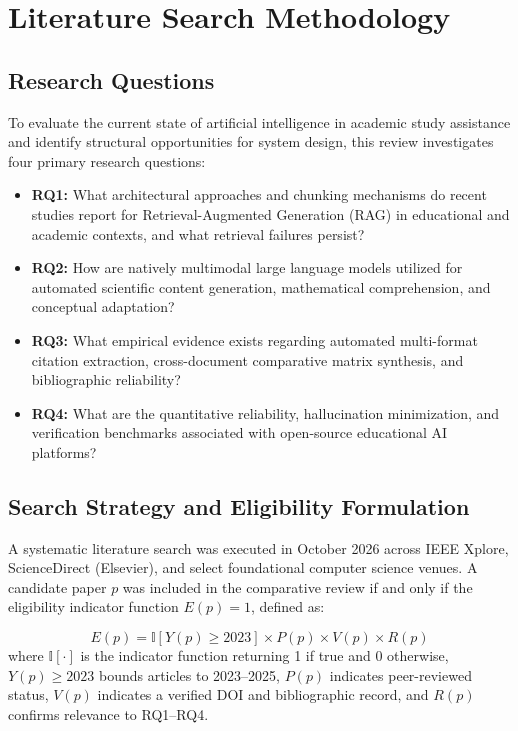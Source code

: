 \documentclass[conference]{IEEEtran}
\begin{document}
\section{Literature Search Methodology}

\subsection{Research Questions}
To evaluate the current state of artificial intelligence in academic study assistance and identify structural opportunities for system design, this review investigates four primary research questions:
\begin{itemize}
    \item \textbf{RQ1:} What architectural approaches and chunking mechanisms do recent studies report for Retrieval-Augmented Generation (RAG) in educational and academic contexts, and what retrieval failures persist?
    \item \textbf{RQ2:} How are natively multimodal large language models utilized for automated scientific content generation, mathematical comprehension, and conceptual adaptation?
    \item \textbf{RQ3:} What empirical evidence exists regarding automated multi-format citation extraction, cross-document comparative matrix synthesis, and bibliographic reliability?
    \item \textbf{RQ4:} What are the quantitative reliability, hallucination minimization, and verification benchmarks associated with open-source educational AI platforms?
\end{itemize}

\subsection{Search Strategy and Eligibility Formulation}
A systematic literature search was executed in October 2026 across IEEE Xplore, ScienceDirect (Elsevier), and select foundational computer science venues. A candidate paper $p$ was included in the comparative review if and only if the eligibility indicator function $E(p) = 1$, defined as:

\begin{equation}
E(p) = \mathbb{I}[Y(p) \ge 2023] \times P(p) \times V(p) \times R(p)
\end{equation}
where $\mathbb{I}[\cdot]$ is the indicator function returning 1 if true and 0 otherwise, $Y(p) \ge 2023$ bounds articles to 2023--2025, $P(p)$ indicates peer-reviewed status, $V(p)$ indicates a verified DOI and bibliographic record, and $R(p)$ confirms relevance to RQ1--RQ4.
\end{document}
